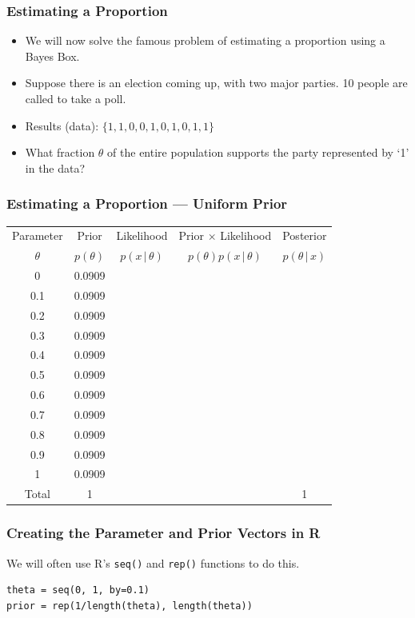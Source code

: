 \documentclass{beamer}
\newcommand{\given}{\,|\,}
\begin{document}
\begin{frame}
\frametitle{Estimating a Proportion}

\begin{itemize}
\item We will now solve the famous problem of estimating a
proportion using a Bayes Box.\pause
\item Suppose there is an election coming up, with two major
parties. 10 people are called to take a poll.\pause
\item Results (data): $\{1, 1, 0, 0, 1, 0, 1, 0, 1, 1\}$\pause
\item What fraction $\theta$ of the entire population supports the party
represented by `1' in the data?
\end{itemize}

\end{frame}

\begin{frame}
\frametitle{Estimating a Proportion --- Uniform Prior}

\centering
{\footnotesize
\begin{tabular}{|c|c|c|c|c|}
\hline
Parameter & Prior & Likelihood & Prior $\times$ Likelihood & Posterior \\
$\theta$  & $p(\theta)$ & $p(x \given \theta)$ & $p(\theta)p(x\given\theta)$ & $p(\theta\given x)$ \\
\hline
0 & 0.0909 & & & \\
0.1 & 0.0909  &  & & \\
0.2 & 0.0909  &  & & \\
0.3 & 0.0909 &  & & \\
0.4 & 0.0909  &  & & \\
0.5 & 0.0909 & & & \\
0.6 & 0.0909 & & & \\
0.7 & 0.0909 & & & \\
0.8 & 0.0909 & & & \\
0.9 & 0.0909 & & & \\
1   & 0.0909 & & & \\
\hline
Total & 1 & & & 1 \\
\hline
\end{tabular}
}

\end{frame}


\begin{frame}[fragile]
\frametitle{Creating the Parameter and Prior Vectors in R}
We will often use R's \texttt{seq()} and
\texttt{rep()} functions to do this.\pause

\begin{verbatim}
theta = seq(0, 1, by=0.1)
prior = rep(1/length(theta), length(theta))
\end{verbatim}

\end{frame}
\end{document}
